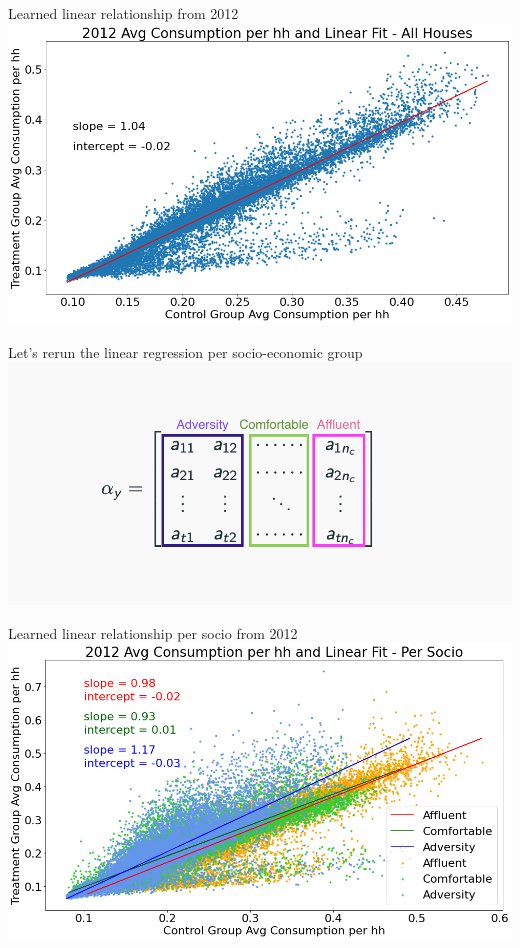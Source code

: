 \documentclass{beamer}
\begin{document}
\begin{frame}{Learned linear relationship from 2012}
  \centering
  \includegraphics[width=1\textwidth]{images/lin-reg-total.png}
\end{frame}

\begin{frame}{Let's rerun the linear regression per socio-economic group}
  \centering
  \includegraphics[width=1\textwidth]{images/alpha-per-socio.png}
\end{frame}

\begin{frame}{Learned linear relationship per socio from 2012}
  \centering
  \includegraphics[width=1\textwidth]{images/lin-reg-per-socio.png}
\end{frame}
\end{document}
